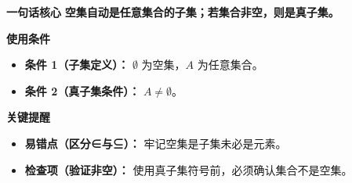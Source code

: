 \begin{summarybox}
	\textbf{\textcolor{CSummary}{一句话核心}}
	\textbf{空集自动是任意集合的子集；若集合非空，则是真子集。}

	\medskip
	\textbf{\textcolor{CSummary}{使用条件}}
	\begin{itemize}[leftmargin=*, itemsep=0.5em, topsep=0.4em]
		\item \textbf{条件 1（子集定义）：} $\emptyset$ 为空集，$A$ 为任意集合。
		\item \textbf{条件 2（真子集条件）：} $A \neq \emptyset$。
	\end{itemize}

	\medskip
	\textbf{\textcolor{CSummary}{关键提醒}}
	\begin{itemize}[leftmargin=*, itemsep=0.5em, topsep=0.4em]
		\item \textbf{易错点（区分∈与⊆）：} 牢记空集是子集未必是元素。
		\item \textbf{检查项（验证非空）：} 使用真子集符号前，必须确认集合不是空集。
	\end{itemize}

\end{summarybox}

